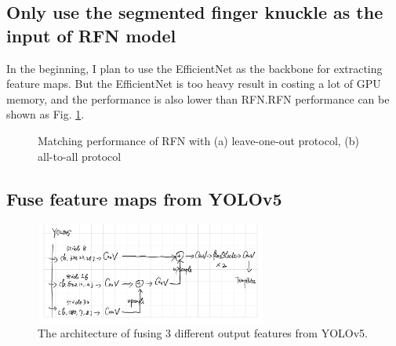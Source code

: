 \subsection{Only use the segmented finger knuckle as the input of RFN model}

In the beginning, I plan to use the EfficientNet as the backbone for extracting feature maps. But the EfficientNet is too heavy result in costing a lot of GPU memory, and the performance is also lower than RFN.RFN performance can be shown as Fig. \ref{rfn-roc}.

\begin{figure}[h]
    \centering

    \caption{Matching performance of RFN with (a) leave-one-out protocol, (b) all-to-all protocol}
    \label{rfn-roc}
\end{figure}

\subsection{Fuse feature maps from YOLOv5}

\begin{figure}[ht!]
    \centering
    \includegraphics[width=3in]{Figure/04-11-2022/assistantmodel.jpg}
    \caption{The architecture of fusing 3 different output features from YOLOv5.}
    \label{assistantmodel}
\end{figure}

